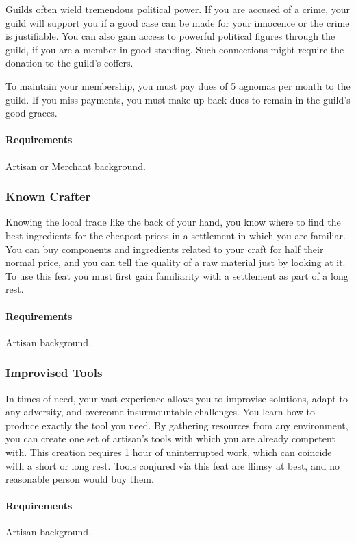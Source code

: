             Guilds often wield tremendous political power.
            If you are accused of a crime, your guild will support you if a good case can be made for your innocence or the crime is justifiable.
            You can also gain access to powerful political figures through the guild, if you are a member in good standing.
            Such connections might require the donation to the guild's coffers.

            To maintain your membership, you must pay dues of 5 agnomas per month to the guild.
            If you miss payments, you must make up back dues to remain in the guild's good graces.
            \paragraph{Requirements} Artisan or Merchant background.
        \subsubsection{Known Crafter} \label{feat::knowncrafter}
            Knowing the local trade like the back of your hand, you know where to find the best ingredients for the cheapest prices in a settlement in which you are familiar.
            You can buy components and ingredients related to your craft for half their normal price, and you can tell the quality of a raw material just by looking at it.
            To use this feat you must first gain familiarity with a settlement as part of a long rest.
            \paragraph{Requirements} Artisan background.
        \subsubsection{Improvised Tools} \label{feat::improvisedtools}
            In times of need, your vast experience allows you to improvise solutions, adapt to any adversity, and overcome insurmountable challenges.
            You learn how to produce exactly the tool you need.
            By gathering resources from any environment, you can create one set of artisan's tools with which you are already competent with.
            This creation requires 1 hour of uninterrupted work, which can coincide with a short or long rest.
            Tools conjured via this feat are flimsy at best, and no reasonable person would buy them.
            \paragraph{Requirements} Artisan background.

